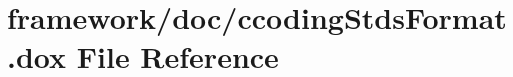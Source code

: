 \hypertarget{ccoding_stds_format_8dox}{}\section{framework/doc/ccoding\+Stds\+Format.dox File Reference}
\label{ccoding_stds_format_8dox}
